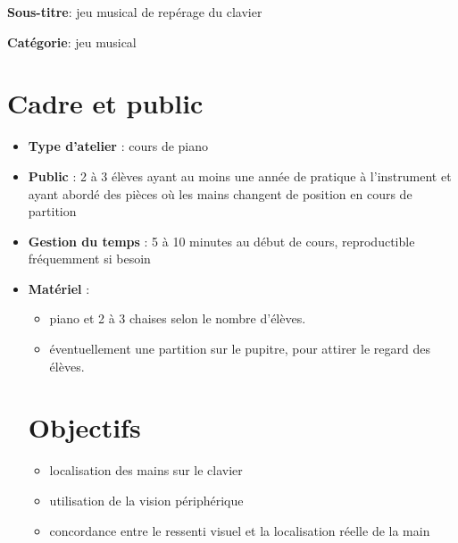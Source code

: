 \documentclass[a4paper,11pt,bibliography=totoc,numbers=noenddot,listof=flat,DIV=11,BCOR=0mm]{scrreprt}%
\begin{document}
{\large \textbf{Sous-titre}}:
 jeu musical de repérage du clavier

{\large \textbf{Catégorie}}:
jeu musical

\section*{Cadre et public}
\begin{itemize}
\item [\textbullet]\textbf{Type d'atelier} : cours de piano

\item [\textbullet]\textbf{Public} : 2 à 3 élèves ayant au moins une année de pratique à l'instrument et ayant abordé des pièces où les mains changent de position en cours de partition

\item [\textbullet]\textbf{Gestion du temps} : 5 à 10 minutes au début de cours, reproductible fréquemment si besoin

\item [\textbullet]\textbf{Matériel} : 
\begin{itemize} 
\item piano et 2 à 3 chaises selon le nombre d'élèves.
\item éventuellement une partition sur le pupitre, pour attirer le regard des élèves.
\end{itemize}


 





\section*{Objectifs}
\begin{itemize}
\item localisation des mains sur le clavier
\item utilisation de la vision périphérique
\item concordance entre le ressenti visuel et la localisation réelle de la main
\end{itemize}


\end{itemize}
\end{document}
